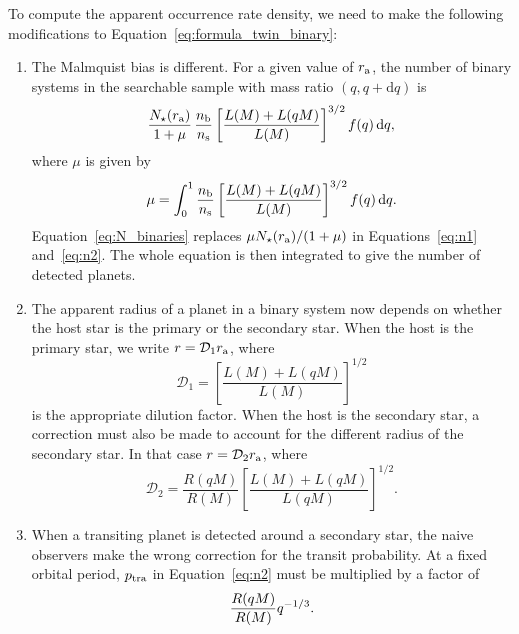 \documentclass[12pt,modern]{aastex61}
\renewcommand{\a}{_{\rm a}}
\begin{document}
To compute the apparent occurrence rate density, we need to make
the following modifications to Equation~\ref{eq:formula_twin_binary}:
%
\begin{enumerate}
%
\item The Malmquist bias is different.  For a given value of $r\a$, the
  number of binary systems in the searchable sample with mass ratio
  $(q, q+\mathrm{d}q)$ is
\begin{equation}
    {N_\star(r\a)\over{1+\mu}}\, {n_{\rm b}\over n_{\rm s}}
    \left[{L(M) + L(qM) \over L(M)}\right]^{3/2}
    f(q)\,\mathrm{d}q,
    \label{eq:N_binaries}
\end{equation}
where $\mu$ is given by
\begin{equation}
    \mu= 
    \int_0^1 {n_{\rm b}\over n_{\rm s}}\left[{L(M) + L(qM)
    \over L(M)}\right]^{3/2} f(q)\,\mathrm{d}q.
    \label{eq:mu_general}
\end{equation}
Equation~\ref{eq:N_binaries} replaces ${\mu N_\star(r\a)/(1+\mu)}$
in Equations~\ref{eq:n1} and~\ref{eq:n2}.
The whole equation is then integrated to give the number of
detected planets.

\item The apparent radius of a planet in a binary system now depends
on whether the host star is the primary or the secondary star. When the host
is the primary star, we write $r=\mathcal{D}_1 r\a$, where
\begin{equation}
    \mathcal{D}_1
    = \left[ \frac{ L(M) + L(qM) }{ L(M) } \right]^{1/2}
    \label{eq:dil_1}
\end{equation}
is the appropriate dilution factor.
When the host is the secondary star, a correction must also be made
to account for the different radius of the secondary star.
In that case $r=\mathcal{D}_2 r\a$, where
\begin{equation}
  \mathcal{D}_2
  = \frac{R(qM)}{R(M)}
    \left[ \frac{L(M) + L(qM)}{L(qM)} \right]^{1/2}.
  \label{eq:dil_2}
\end{equation}

\item When a transiting planet is detected around a secondary star,
  the naive observers make the wrong correction for the transit
  probability.  At a fixed orbital period, $p_{\rm tra}$
  in Equation~\ref{eq:n2} must be multiplied by a factor of
\begin{equation}
  {R(qM) \over R(M)}q^{-1/3}.
\end{equation}

\end{enumerate}
\end{document}

